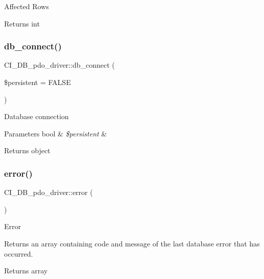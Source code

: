 Affected Rows

\begin{DoxyReturn}{Returns}
int 
\end{DoxyReturn}
\mbox{\label{class_c_i___d_b__pdo__driver_afe7bc54d09d1a90059fdcb2c6fc34d7c}} 
\subsubsection{\texorpdfstring{db\+\_\+connect()}{db\_connect()}}
{\footnotesize\ttfamily C\+I\+\_\+\+D\+B\+\_\+pdo\+\_\+driver\+::db\+\_\+connect (\begin{DoxyParamCaption}\item[{}]{\$persistent = {\ttfamily FALSE} }\end{DoxyParamCaption})}

Database connection


\begin{DoxyParams}[1]{Parameters}
bool & {\em \$persistent} & \\
\hline
\end{DoxyParams}
\begin{DoxyReturn}{Returns}
object 
\end{DoxyReturn}
\mbox{\label{class_c_i___d_b__pdo__driver_ad0486e6eae22694fc0e9ebe875381cf3}} 
\subsubsection{\texorpdfstring{error()}{error()}}
{\footnotesize\ttfamily C\+I\+\_\+\+D\+B\+\_\+pdo\+\_\+driver\+::error (\begin{DoxyParamCaption}{ }\end{DoxyParamCaption})}

Error

Returns an array containing code and message of the last database error that has occurred.

\begin{DoxyReturn}{Returns}
array 
\end{DoxyReturn}
\mbox{\label{class_c_i___d_b__pdo__driver_aa3310248982b74638201f09982085a59}} 
